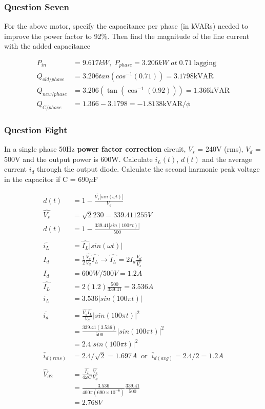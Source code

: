 \documentclass[a4paper,11pt]{article}
\begin{document}
\newpage
\subsubsection*{Question Seven}
For the above motor, specify the capacitance per phase (in kVARs) needed to improve the power factor to 92\%. Then find the magnitude of the line current with the added capacitance

\begin{align*}
    P_{in} &= 9.617kW,\; P_{phase}=3.206kW\;at\;0.71\;\mathrm{lagging}\\
    Q_{old/phase} &= 3.206tan(cos^{-1}(0.71)) = 3.1798 \mathrm{kVAR} \\
    Q_{new/phase} &= 3.206\left(\tan\left(\cos^{-1}\left(0.92\right)\right)\right) = 1.366 \mathrm{kVAR} \\
    Q_{C/phase} &= 1.366 - 3.1798=-1.8138 \mathrm{kVAR}/\phi
\end{align*}

\subsubsection*{Question Eight}
In a single phase 50Hz \textbf{power factor correction} circuit, $V_s$ = 240V (rms), $V_d$ = 500V and the output power is 600W. Calculate $i_L(t)$, $d(t)$ and the average current $i_d$ through the output diode. Calculate the second harmonic peak voltage in the capacitor if C = 690$\mu$F

\begin{align*}
    d(t) &= 1-\frac{\hat{V_s}|sin(\omega t)|}{V_d}\\
    \hat{V_s} &= \sqrt{2}230 = 339.411255V\\
    d(t) &= 1-\frac{339.41|sin(100\pi t)|}{500}\\\\
    \bar{i_L} &= \hat{I_L}|sin(\omega t)| \\
    I_d &= \frac{1}{2}\frac{\hat{V_s}}{V_d}\hat{I_L} \rightarrow \hat{I_L} = 2I_d \frac{V_d}{\hat{V_s}} \\
    I_d &= 600W/500V=1.2A \\
    \hat{I_L} &= 2(1.2) \frac{500}{339.41} = 3.536A \\
    \bar{i_L} &= 3.536|sin(100\pi t)| \\\\
    \bar{i_d} &= \frac{\hat{V_s}\hat{I_L}}{V_d}|sin(100\pi t)|^2 \\
              &= \frac{339.41(3.536)}{500}|sin(100\pi t)|^2\\
                &= 2.4|sin(100\pi t)|^2 \\
    \bar{i}_{d(rms)} &= 2.4/\sqrt{2} = 1.697A \;\;\mathrm{or}\;\; \bar{i}_{d(avg)} = 2.4/2 = 1.2A\\\\
    \hat{V}_{d2} &= \frac{\hat{I_L}}{4\omega C}\frac{\hat{V_s}}{V_d} \\
     &= \frac{3.536}{400\pi(690\times10^{-6})}\frac{339.41}{500} \\
    &= 2.768V
\end{align*}
\end{document}
